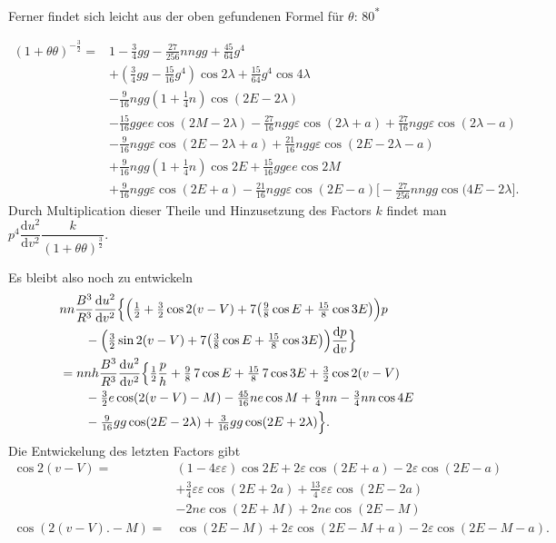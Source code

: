 \clearpage
\begingroup
{}
\renewcommand{\headrulewidth}{0pt}
\noindent Ferner findet sich leicht aus der oben gefundenen Formel für \(\theta\):
\noindent\hfill80\textsuperscript{*}\par
{}
\[
\begin{aligned}
(1+\theta\theta)^{-\frac32}
={}&1-\tfrac34gg-\tfrac{27}{256}nngg+\tfrac{45}{64}g^4\\
&+(\tfrac34gg-\tfrac{15}{16}g^4)\cos2\lambda
 +\tfrac{15}{64}g^4\cos4\lambda\\
&-\tfrac{9}{16}ngg(1+\tfrac14n)\cos(2E-2\lambda)\\
&-\tfrac{15}{16}ggee\cos(2M-2\lambda)
 -\tfrac{27}{16}ngg\varepsilon\cos(2\lambda+a)
 +\tfrac{27}{16}ngg\varepsilon\cos(2\lambda-a)\\
&-\tfrac{9}{16}ngg\varepsilon\cos(2E-2\lambda+a)
 +\tfrac{21}{16}ngg\varepsilon\cos(2E-2\lambda-a)\\
&+\tfrac{9}{16}ngg(1+\tfrac14n)\cos2E
 +\tfrac{15}{16}ggee\cos2M\\
&+\tfrac{9}{16}ngg\varepsilon\cos(2E+a)
 -\tfrac{21}{16}ngg\varepsilon\cos(2E-a)
 \bigl[-\tfrac{27}{256}nngg\cos(4E-2\lambda\bigr].
\end{aligned}
\]
\noindent Durch Multiplication dieser Theile und Hinzusetzung des Factors \(k\) findet
man \(p^4\dfrac{\mathrm du^2}{\mathrm dv^2}\dfrac{k}{(1+\theta\theta)^{\frac32}}\).
\par\noindent\hspace*{\parindent}Es bleibt also noch zu entwickeln
\[
\begin{aligned}
&nn\frac{B^3}{R^3}\frac{\mathrm du^2}{\mathrm dv^2}
 \Bigl\{\Bigl(\tfrac12+\tfrac32\cos2(v-V)
 +7\bigl(\tfrac98\cos E+\tfrac{15}{8}\cos3E\bigr)\Bigr)p\\
&\qquad-\Bigl(\tfrac32\sin2(v-V)
 +7\bigl(\tfrac38\cos E+\tfrac{15}{8}\cos3E\bigr)\Bigr)
 \frac{\mathrm dp}{\mathrm dv}\Bigr\}\\
&=nnh\frac{B^3}{R^3}\frac{\mathrm du^2}{\mathrm dv^2}
 \Bigl\{\tfrac12\frac{p}{h}+\tfrac98\,7\cos E+\tfrac{15}{8}\,7\cos3E
 +\tfrac32\cos2(v-V)\\
&\qquad-\tfrac32e\cos(2(v-V)-M)-\tfrac{45}{16}ne\cos M
 +\tfrac94nn-\tfrac34nn\cos4E\\
&\qquad-\tfrac{9}{16}gg\cos(2E-2\lambda)
 +\tfrac{3}{16}gg\cos(2E+2\lambda)\Bigr\}.
\end{aligned}
\]
\noindent Die Entwickelung des letzten Factors gibt
\[
\begin{aligned}
\cos2(v-V)
={}&(1-4\varepsilon\varepsilon)\cos2E
 +2\varepsilon\cos(2E+a)-2\varepsilon\cos(2E-a)\\
&+\tfrac34\varepsilon\varepsilon\cos(2E+2a)
 +\tfrac{13}{4}\varepsilon\varepsilon\cos(2E-2a)\\
&-2ne\cos(2E+M)+2ne\cos(2E-M)\\
\cos(2(v-V)\mathord{.}-M)
={}&\cos(2E-M)+2\varepsilon\cos(2E-M+a)
 -2\varepsilon\cos(2E-M-a).
\end{aligned}
\]
